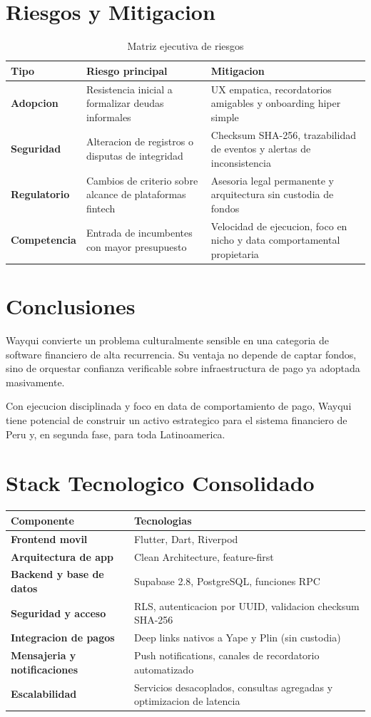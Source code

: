 \documentclass[11pt,a4paper]{article}
\begin{document}
\section{Riesgos y Mitigacion}
\begin{table}[htbp]
\centering
\caption{Matriz ejecutiva de riesgos}
\begin{tabularx}{\textwidth}{>{\bfseries}p{2.7cm}X X}
\toprule
Tipo & Riesgo principal & Mitigacion \\
\midrule
Adopcion & Resistencia inicial a formalizar deudas informales & UX empatica, recordatorios amigables y onboarding hiper simple \\
Seguridad & Alteracion de registros o disputas de integridad & Checksum SHA-256, trazabilidad de eventos y alertas de inconsistencia \\
Regulatorio & Cambios de criterio sobre alcance de plataformas fintech & Asesoria legal permanente y arquitectura sin custodia de fondos \\
Competencia & Entrada de incumbentes con mayor presupuesto & Velocidad de ejecucion, foco en nicho y data comportamental propietaria \\
\bottomrule
\end{tabularx}
\end{table}

\section{Conclusiones}
Wayqui convierte un problema culturalmente sensible en una categoria de software financiero de alta recurrencia. Su ventaja no depende de captar fondos, sino de orquestar confianza verificable sobre infraestructura de pago ya adoptada masivamente.

Con ejecucion disciplinada y foco en data de comportamiento de pago, Wayqui tiene potencial de construir un activo estrategico para el sistema financiero de Peru y, en segunda fase, para toda Latinoamerica.

\appendix

\section{Stack Tecnologico Consolidado}
\begin{longtable}{>{\bfseries}p{4.2cm}p{9.8cm}}
\toprule
Componente & Tecnologias \\
\midrule
Frontend movil & Flutter, Dart, Riverpod \\
Arquitectura de app & Clean Architecture, feature-first \\
Backend y base de datos & Supabase 2.8, PostgreSQL, funciones RPC \\
Seguridad y acceso & RLS, autenticacion por UUID, validacion checksum SHA-256 \\
Integracion de pagos & Deep links nativos a Yape y Plin (sin custodia) \\
Mensajeria y notificaciones & Push notifications, canales de recordatorio automatizado \\
Escalabilidad & Servicios desacoplados, consultas agregadas y optimizacion de latencia \\
\bottomrule
\end{longtable}
\end{document}
